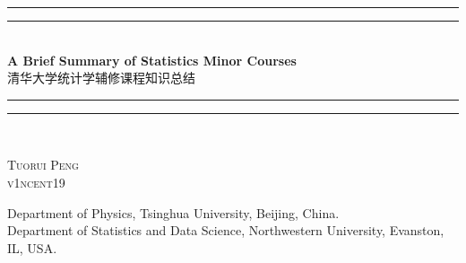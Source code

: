 \documentclass[x11names,11pt,a4paper,openany]{book}
\begin{document}
\begin{titlepage}
  \thispagestyle{TitlePage}
  \begin{center}
      \vspace*{4cm}
{      \settowidth{\unitlength}{\Huge A Brief Summary of Statistics Minor Courses}
      \rule{\unitlength}{1.6pt}\vspace*{-\baselineskip}\vspace*{2pt}
      \rule{\unitlength}{0.4pt}\\[\baselineskip]
      \huge\textbf{A Brief Summary of Statistics Minor Courses}\\\LARGE\heiti 清华大学统计学辅修课程知识总结\\[0.3\baselineskip]
      \rule{\unitlength}{0.4pt}\vspace*{-\baselineskip}\vspace{3.2pt}
      \rule{\unitlength}{1.6pt}\\[\baselineskip]}
          
      \vspace{1.5cm}
{      \large\scshape Tuorui Peng\\
      \ttfamily\normalsize v1ncent19}

      \vspace{1.5cm}
{      \normalshape\normalfont\small
       Department of Physics, Tsinghua University, Beijing, China.\\
       Department of Statistics and Data Science, Northwestern University, Evanston, IL, USA.}
          

      \vspace{1.5cm}
      
          
  \end{center}
\end{titlepage}

\newpage
\thispagestyle{empty}
\end{document}
